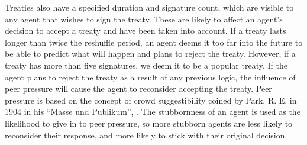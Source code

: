 \begin{table}[htb]
    \centering
    \caption{Treaty Acceptance.}
\end{table}
Treaties also have a specified duration and signature count, which are visible to any agent that wishes to sign the treaty. These are likely to affect an agent’s decision to accept a treaty and have been taken into account. If a treaty lasts longer than twice the reshuffle period, an agent deems it too far into the future to be able to predict what will happen and plans to reject the treaty. However, if a treaty has more than five signatures, we deem it to be a popular treaty. If the agent plans to reject the treaty as a result of any previous logic, the influence of peer pressure will cause the agent to reconsider accepting the treaty. Peer pressure is based on the concept of crowd suggestibility coined by Park, R. E.  in 1904 in his “Masse und Publikum”, \cite{Solr-413687}. The stubbornness of an agent is used as the likelihood to give in to peer pressure, so more stubborn agents are less likely to reconsider their response, and more likely to stick with their original decision.

